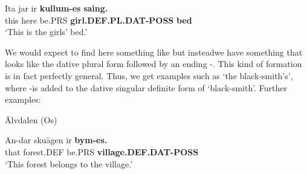  \ea\label{}
\gll Ita  jar  ir  \textbf{kullum-es}\textbf{  saing.}\\


this  here  be.PRS  \textbf{girl.DEF.PL.DAT-POSS} \textbf{bed}\\

\glt ‘This is the girls’ bed.’

\z

We would expect to find here something like but instead\textstyleLinguisticExample{ }we have something that looks like the dative plural form  followed by an ending \nobreakdash-. This kind of formation is in fact perfectly general. Thus, we get examples such as  ‘the black-smith’s’, where \nobreakdash-is added to the dative singular definite form  of  ‘black-smith’. Further examples:


\item 

Älvdalen (Os)



\item 


 \ea\label{}
\gll An-dar  skuägen  ir  \textbf{bym-es.}\\


that  forest.DEF  be.PRS  \textbf{village.DEF.DAT-POSS}\\

\glt ‘This forest belongs to the village.’

\z

\item 


